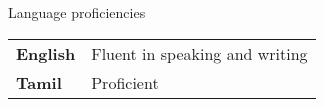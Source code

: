 \documentclass{resume} %
\makeatletter
\newcommand{\entry}[2]{#1 & #2 \tabularnewline} %
\newcommand{\tableEnv}[2]{%
  \begin{rSection}{#1} %
    \begin{adjustwidth}{0.0in}{0.1in} %
      \begin{tabularx}{\linewidth}{@{} >{\bfseries}l @{\hspace{6ex}} X @{}}
        #2 %
      \end{tabularx}
    \end{adjustwidth}
  \end{rSection}
}
\makeatother
\begin{document}

\tableEnv{Language proficiencies}{
    \entry{English}{Fluent in speaking and writing}
    \entry{Tamil}{Proficient}
}



\end{document}
